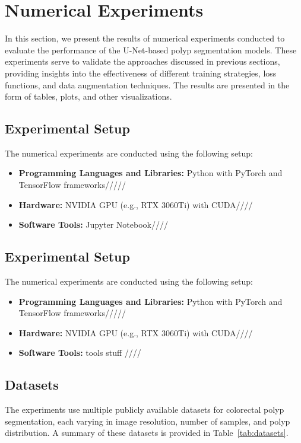 \chapter{Numerical Experiments}

In this section, we present the results of numerical experiments conducted to evaluate the performance of the U-Net-based polyp segmentation models. These experiments serve to validate the approaches discussed in previous sections, providing insights into the effectiveness of different training strategies, loss functions, and data augmentation techniques. The results are presented in the form of tables, plots, and other visualizations.

\section{Experimental Setup}
The numerical experiments are conducted using the following setup:
\begin{itemize}
    \item \textbf{Programming Languages and Libraries:} Python with PyTorch and TensorFlow frameworks/////
    \item \textbf{Hardware:} NVIDIA GPU (e.g., RTX 3060Ti) with CUDA////
    \item \textbf{Software Tools:} Jupyter Notebook////
\end{itemize}


\section{Experimental Setup}
The numerical experiments are conducted using the following setup:
\begin{itemize}
    \item \textbf{Programming Languages and Libraries:} Python with PyTorch and TensorFlow frameworks/////
    \item \textbf{Hardware:} NVIDIA GPU (e.g., RTX 3060Ti) with CUDA////
    \item \textbf{Software Tools:} tools stuff ////
\end{itemize}


\section{Datasets}
The experiments use multiple publicly available datasets for colorectal polyp segmentation, each varying in image resolution, number of samples, and polyp distribution. A summary of these datasets is provided in Table~\ref{tab:datasets}.

